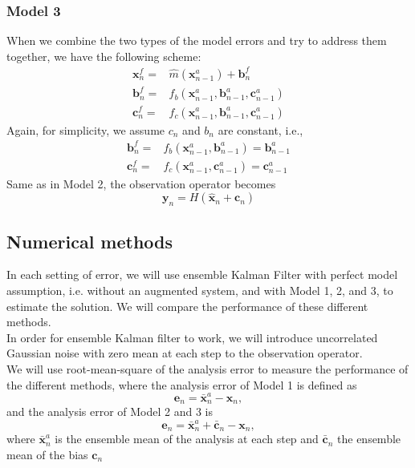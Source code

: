 \documentclass{report}
\begin{document}
\subsubsection{Model 3}
When we combine the two types of the model errors and try to address them together, we have the following scheme:
\begin{align}
\pmb{x}_{n}^{f}=&\hat{m}(\pmb{x}_{n-1}^{a})+\pmb{b}_{n}^{f}\\
\pmb{b}_{n}^{f}=&f_{b}(\pmb{x}_{n-1}^{a},\pmb{b}_{n-1}^{a},\pmb{c}_{n-1}^{a})\\
\pmb{c}_{n}^{f}=&f_{c}(\pmb{x}_{n-1}^{a},\pmb{b}_{n-1}^{a},\pmb{c}_{n-1}^{a})
\end{align}
Again, for simplicity, we assume $c_n$ and $b_n$ are constant, i.e.,
\begin{align}
\pmb{b}_{n}^{f}=&f_{b}(\pmb{x}_{n-1}^{a},\pmb{b}_{n-1}^{a})=\pmb{b}_{n-1}^{a}\\
\pmb{c}_{n}^{f}=&f_{c}(\pmb{x}_{n-1}^{a},\pmb{c}_{n-1}^{a})=\pmb{c}_{n-1}^{a}
\end{align}
Same as in Model 2, the observation operator becomes
\begin{equation}
\pmb{y}_n=H(\hat{\pmb{x}}_n+\pmb{c}_n)
\end{equation}
\subsection*{Numerical methods}
In each setting of error, we will use ensemble Kalman Filter with perfect model assumption, i.e. without an augmented system, and with Model 1, 2, and 3, to estimate the solution. We will compare the performance of these different methods.\\
In order for ensemble Kalman filter to work, we will introduce uncorrelated Gaussian noise with zero mean at each step to the observation operator.\\
We will use root-mean-square of the analysis error to measure the performance of the different methods, where the analysis error of Model 1 is defined as
\begin{equation}
\pmb{e}_n=\bar{\pmb{x}}_n^a-\pmb{x}_n,
\end{equation}
and the analysis error of Model 2 and 3 is
\begin{equation}
\pmb{e}_n=\bar{\pmb{x}}_n^a+\bar{\pmb{c}}_n-\pmb{x}_n,
\end{equation}
where $\bar{\pmb{x}}_n^a$ is the ensemble mean of the analysis at each step and $\bar{\pmb{c}}_n$ the ensemble mean of the bias $\pmb{c}_n$
\end{document}

